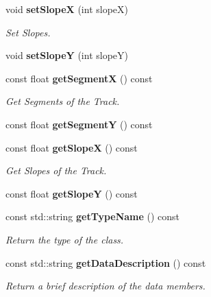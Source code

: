\begin{DoxyCompactItemize}
\item 
void {\bf set\-Slope\-X} (int slope\-X)\label{classCALICE_1_1DWCBlock_afcbe9b073eb3d80d15e6ceb6aad33f83}

\begin{DoxyCompactList}\small\item\em Set Slopes. \end{DoxyCompactList}\item 
void {\bfseries set\-Slope\-Y} (int slope\-Y)\label{classCALICE_1_1DWCBlock_a22f058df6f5d6979bf499a92cc3de5c7}

\item 
const float {\bf get\-Segment\-X} () const \label{classCALICE_1_1DWCBlock_acfb4a3ed04d0fdf80eb86db4e7371c58}

\begin{DoxyCompactList}\small\item\em Get Segments of the Track. \end{DoxyCompactList}\item 
const float {\bfseries get\-Segment\-Y} () const \label{classCALICE_1_1DWCBlock_a9a9204de822bef1302c3dc972e77da50}

\item 
const float {\bf get\-Slope\-X} () const \label{classCALICE_1_1DWCBlock_af108c3b0f57fe894907b785e2c3a99eb}

\begin{DoxyCompactList}\small\item\em Get Slopes of the Track. \end{DoxyCompactList}\item 
const float {\bfseries get\-Slope\-Y} () const \label{classCALICE_1_1DWCBlock_ad4d68ef2dbf95df38f0aef8f27bcd65c}

\item 
const std\-::string {\bf get\-Type\-Name} () const \label{classCALICE_1_1DWCBlock_acccf76b379873f8b81e26c9974cd6381}

\begin{DoxyCompactList}\small\item\em Return the type of the class. \end{DoxyCompactList}\item 
const std\-::string {\bf get\-Data\-Description} () const \label{classCALICE_1_1DWCBlock_a48a3047dfef2c94b1124b0c908c44995}

\begin{DoxyCompactList}\small\item\em Return a brief description of the data members. \end{DoxyCompactList}\end{DoxyCompactItemize}


